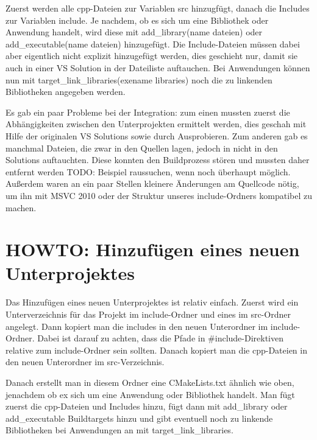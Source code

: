 Zuerst werden alle cpp-Dateien zur Variablen src hinzugfügt, danach die
Includes zur Variablen include. Je nachdem, ob es sich um eine Bibliothek
oder
Anwendung handelt, wird diese mit add\_library(name dateien) oder
add\_executable(name dateien) hinzugefügt. Die Include-Dateien müssen dabei
aber eigentlich nicht explizit hinzugefügt werden, dies geschieht nur,
damit
sie auch in einer VS Solution in der Dateiliste auftauchen. Bei Anwendungen
können nun mit target\_link\_libraries(exename libraries) noch die zu
linkenden
Bibliotheken angegeben werden.

Es gab ein paar Probleme bei der Integration: zum einen mussten zuerst die
Abhängigkeiten zwischen den Unterprojekten ermittelt werden, dies geschah
mit
Hilfe der originalen VS Solutions sowie durch Ausprobieren. Zum anderen gab
 es
manchmal Dateien, die zwar in den Quellen lagen, jedoch in nicht in den
Solutions auftauchten. Diese konnten den Buildprozess stören und mussten
daher
entfernt werden TODO: Beispiel raussuchen, wenn noch überhaupt möglich.
Außerdem waren an ein paar Stellen kleinere Änderungen am Quellcode nötig,
um
ihn mit MSVC 2010 oder der Struktur unseres include-Ordners kompatibel zu
machen.

\section{HOWTO: Hinzufügen eines neuen Unterprojektes}
Das Hinzufügen eines neuen Unterprojektes ist relativ einfach.
Zuerst wird ein Unterverzeichnis für das Projekt im include-Ordner und
eines im
src-Ordner angelegt. Dann kopiert man die includes in den neuen Unterordner
 im
include-Ordner. Dabei ist darauf zu achten, dass die Pfade in
\#include-Direktiven relative zum include-Ordner sein sollten. Danach
kopiert
man die cpp-Dateien in den neuen Unterordner im src-Verzeichnis.

Danach erstellt man in diesem Ordner eine CMakeLists.txt ähnlich wie oben,
jenachdem ob ex sich um eine Anwendung oder Bibliothek handelt. Man fügt
zuerst
die cpp-Dateien und Includes hinzu, fügt dann mit add\_library oder
add\_executable Buildtargets hinzu und gibt eventuell noch zu linkende
Bibliotheken bei Anwendungen an mit target\_link\_libraries.

